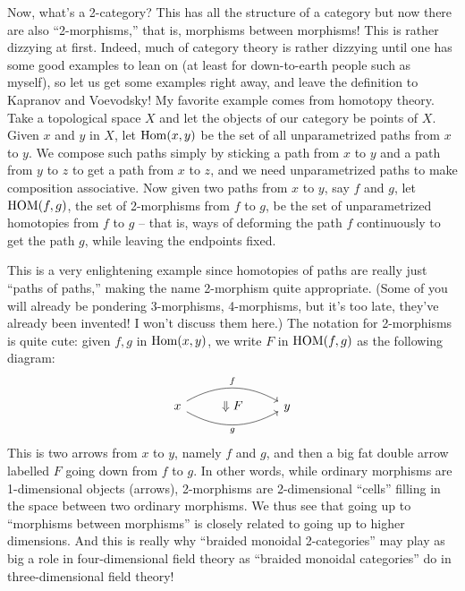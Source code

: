 Now, what's a 2-category?  This has all the structure of a category but
now there are also ``2-morphisms,'' that is, morphisms between morphisms!
This is rather dizzying at first.  Indeed, much of category theory is
rather dizzying until one has some good examples to lean on (at least
for down-to-earth people such as myself), so let us get some examples
right away, and leave the definition to Kapranov and Voevodsky!   My
favorite example comes from homotopy theory.  Take a topological space $X$
and let the objects of our category be points of $X$.  Given $x$ and $y$ in $X$,
let ${\rm Hom}(x,y)$ be the set of all unparametrized paths from $x$ to $y$.  We
compose such paths simply by sticking a path from $x$ to $y$ and a path from
$y$ to $z$ to get a path from $x$ to $z$, and we need unparametrized paths to
make composition associative. Now given two paths from $x$ to $y$, say $f$ and
$g$, let ${\rm HOM}(f,g)$, the set of  2-morphisms from $f$ to $g$, be the set of
unparametrized homotopies from $f$ to $g$ -- that is, ways of deforming the
path $f$ continuously to get the path $g$, while leaving the endpoints fixed.  

This is a very enlightening example since homotopies of paths are really
just ``paths of paths,'' making the name 2-morphism quite appropriate.
(Some of you will already be pondering 3-morphisms, 4-morphisms, but it's
too late, they've already been invented!  I won't discuss them here.)
The notation for 2-morphisms is quite cute: given $f,g$ in ${\rm Hom}(x,y)$, we
write $F$ in ${\rm HOM}(f,g)$ as the following diagram:
\[
\begin{tikzcd}
   x
   \arrow[rr, bend left,"f"]
   \arrow[rr, bend right,"g",swap]
   &
   \zwei F
   &
   y
\end{tikzcd}
\]
This is two arrows from $x$ to $y$, namely $f$ and $g$, and then
a big fat double arrow labelled $F$ going down from $f$ to $g$.  In other
words, while ordinary morphisms are 1-dimensional objects (arrows),
2-morphisms are 2-dimensional ``cells'' filling in the space between two 
ordinary morphisms.  We thus see that going up to ``morphisms between
morphisms'' is closely related to going up to higher dimensions.  And
this is really why ``braided monoidal 2-categories'' may play as big a
role in four-dimensional field theory as ``braided monoidal categories''
do in three-dimensional field theory!

